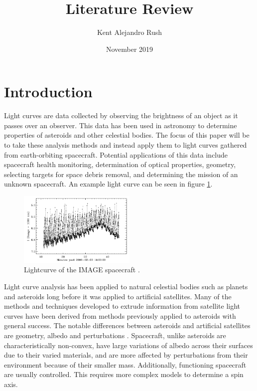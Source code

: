\documentclass{article}
\title{Literature Review}
\author{Kent Alejandro Rush }
\date{November 2019}
\begin{document}
\maketitle

\section{Introduction}

Light curves are data collected by observing the brightness of an object as it passes over an observer. This data has been used in astronomy to determine properties of asteroids and other celestial bodies. The focus of this paper will be to take these analysis methods and instead apply them to light curves gathered from earth-orbiting spacecraft. Potential applications of this data include spacecraft health monitoring, determination of optical properties, geometry, selecting targets for space debris removal, and determining the mission of an unknown spacecraft. An example light curve can be seen in figure \ref{lightcurve_im}.

\begin{figure}[h]
	\centering
	\includegraphics[width=0.5\textwidth]{lightcurve_AMOS}
	\caption{Lightcurve of the IMAGE spacecraft \cite{AMOS}.}
	\label{lightcurve_im}
\end{figure}

Light curve analysis has been applied to natural celestial bodies such as planets and asteroids long before it was applied to artificial satellites. Many of the methods and techniques developed to extrude information from satellite light curves have been derived from methods previously applied to asteroids with general success. The notable differences between asteroids and artificial satellites are geometry, albedo and perturbations \cite{Separating}. Spacecraft, unlike asteroids are characteristically non-convex, have large variations of albedo across their surfaces due to their varied materials, and are more affected by perturbations from their environment because of their smaller mass. Additionally, functioning spacecraft are usually controlled. This requires more complex models to determine a spin axis.
\end{document}
